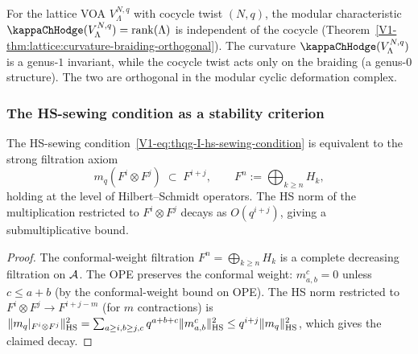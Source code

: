 \begin{remark}
For the lattice VOA $V_\Lambda^{N,q}$ with cocycle twist $(N,q)$, the modular characteristic $\kappaChHodge(V_\Lambda^{N,q}) = \rank(\Lambda)$ is independent of the cocycle (Theorem~\ref{V1-thm:lattice:curvature-braiding-orthogonal}). The curvature $\kappaChHodge(V_\Lambda^{N,q})$ is a genus-$1$ invariant, while the cocycle twist acts only on the braiding (a genus-$0$ structure). The two are orthogonal in the modular cyclic deformation complex.
\end{remark}

\subsubsection{The HS-sewing condition as a stability criterion}

\begin{proposition}
The HS-sewing condition~\eqref{V1-eq:thqg-I-hs-sewing-condition} is equivalent to the strong filtration axiom
\begin{equation}%
m_q(F^i \otimes F^j) \;\subset\; F^{i+j}, \qquad F^n := \bigoplus_{k \geq n} H_k,
\end{equation}
holding at the level of Hilbert--Schmidt operators. The HS norm of the multiplication restricted to $F^i \otimes F^j$ decays as $O(q^{i+j})$, giving a submultiplicative bound.
\end{proposition}

\begin{proof}
The conformal-weight filtration $F^n = \bigoplus_{k \geq n} H_k$ is a complete decreasing filtration on $\mathcal{A}$. The OPE preserves the conformal weight: $m^c_{a,b} = 0$ unless $c \leq a + b$ (by the conformal-weight bound on OPE). The HS norm restricted to $F^i \otimes F^j \to F^{i+j-m}$ (for $m$ contractions) is $\|m_q|_{F^i \otimes F^j}\|_{\operatorname{HS}}^2 = \sum_{a \geq i, b \geq j, c} q^{a+b+c} \|m^c_{a,b}\|_{\operatorname{HS}}^2 \leq q^{i+j} \|m_q\|_{\operatorname{HS}}^2$, which gives the claimed decay.
\end{proof}

